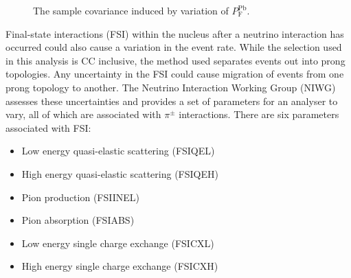 \begin{figure}%
  \centering
  \caption{The sample covariance induced by variation of $P_{\textrm{F}}^{\textrm{Pb}}$.}
  \label{fig:PbXSecCovarianceMatrices}
\end{figure}
\newline
\newline
Final-state interactions (FSI) within the nucleus after a neutrino interaction has occurred could also cause a variation in the event rate.  While the selection used in this analysis is CC inclusive, the method used separates events out into prong topologies.  Any uncertainty in the FSI could cause migration of events from one prong topology to another.  The Neutrino Interaction Working Group (NIWG) assesses these uncertainties and provides a set of parameters for an analyser to vary, all of which are associated with $\pi^{\pm}$ interactions.  There are six parameters associated with FSI:
\begin{itemize}
  \item Low energy quasi-elastic scattering (FSIQEL)
  \item High energy quasi-elastic scattering (FSIQEH)
  \item Pion production (FSIINEL)
  \item Pion absorption (FSIABS)
  \item Low energy single charge exchange (FSICXL)
  \item High energy single charge exchange (FSICXH)
\end{itemize}
